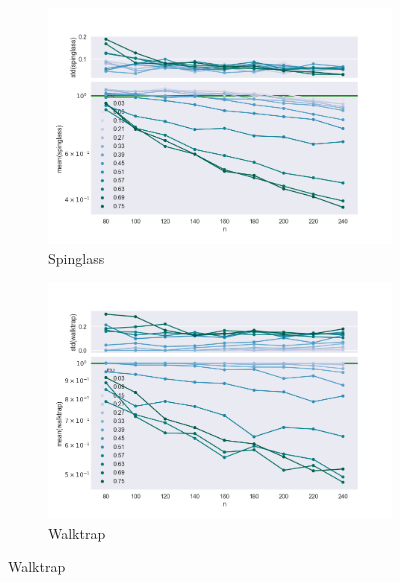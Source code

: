 \begin{figure}
    \begin{subfigure}[b]{0.32\textwidth}
        \includegraphics[width=\textwidth]{fig/ratio_vs_n_spinglass}
        \caption{Spinglass}
        \label{fig:gull}
    \end{subfigure}
    \qquad
    \begin{subfigure}[b]{0.32\textwidth}
        \includegraphics[width=\textwidth]{fig/ratio_vs_n_walktrap}
        \caption{Walktrap}
        \label{fig:tiger}
    \end{subfigure}
    

\end{figure}

